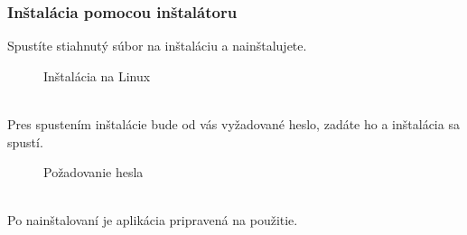 \documentclass[a4paper, 11pt]{article}
\begin{document}
            \subsubsection{Inštalácia pomocou inštalátoru}
                Spustíte stiahnutý súbor na inštaláciu a nainštalujete.  
                \begin{figure}[h]
                    \centering
                        \caption{Inštalácia na Linux}
                \end{figure}
                \vspace{10mm}
                \\Pres spustením inštalácie bude od vás vyžadované heslo, zadáte ho a inštalácia sa spustí.
                    \begin{figure}[h]
                        \centering
                            \caption{Požadovanie hesla}
                    \end{figure}
                \\
                Po nainštalovaní je aplikácia pripravená na použitie.
                \newpage    
\end{document}
